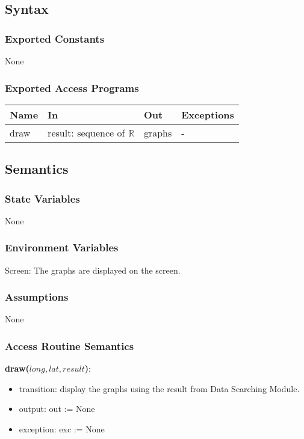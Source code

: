 \documentclass[12pt, titlepage]{article}
\begin{document}
\subsection{Syntax}

\subsubsection{Exported Constants}
None
\subsubsection{Exported Access Programs}

\begin{center}
\begin{tabular}{p{2cm} p{4cm} p{7cm} p{2cm}}
\hline
\textbf{Name} & \textbf{In} & \textbf{Out} & \textbf{Exceptions} \\
\hline
draw & result: sequence of $\mathbb{R}$ & graphs & - \\
\hline
\end{tabular}
\end{center}

\subsection{Semantics}

\subsubsection{State Variables}
None

\subsubsection{Environment Variables}
Screen: The graphs are displayed on the screen.

\subsubsection{Assumptions}
None
\subsubsection{Access Routine Semantics}

\noindent \textbf{draw($long, lat, result$)}:
\begin{itemize}
\item transition: display the graphs using the result from Data Searching Module.
\item output: out := None
\item exception: exc := None
\end{itemize}
\end{document}
